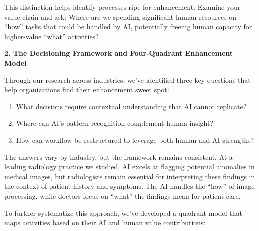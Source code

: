 \documentclass[
  Letterpaper,
]{scrbook}
\begin{document}
This distinction helps identify processes ripe for enhancement. Examine
your value chain and ask: Where are we spending significant human
resources on ``how'' tasks that could be handled by AI, potentially
freeing human capacity for higher-value ``what'' activities?

\textbf{2. The Decisioning Framework and Four-Quadrant Enhancement
Model}

Through our research across industries, we've identified three key
questions that help organizations find their enhancement sweet spot:

\begin{enumerate}
\def\labelenumi{\arabic{enumi}.}
\item
  What decisions require contextual understanding that AI cannot
  replicate?
\item
  Where can AI's pattern recognition complement human insight?
\item
  How can workflow be restructured to leverage both human and AI
  strengths?
\end{enumerate}

The answers vary by industry, but the framework remains consistent. At a
leading radiology practice we studied, AI excels at flagging potential
anomalies in medical images, but radiologists remain essential for
interpreting these findings in the context of patient history and
symptoms. The AI handles the ``how'' of image processing, while doctors
focus on ``what'' the findings mean for patient care.

To further systematize this approach, we've developed a quadrant model
that maps activities based on their AI and human value contributions:

\begin{figure}


\caption{\label{fig-enhancement-framework}}

\end{figure}%
\end{document}
